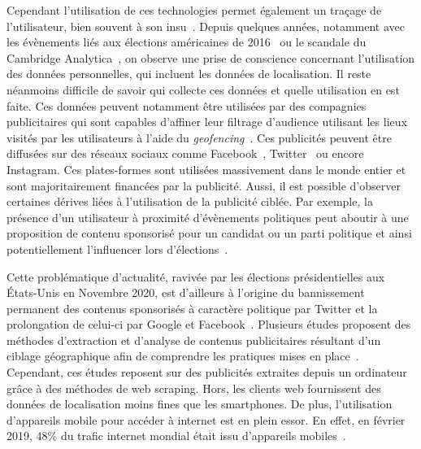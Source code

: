 \documentclass[runningheads]{llncs}
\begin{document}
Cependant l'utilisation de ces technologies permet également un traçage de l'utilisateur, bien souvent à son insu~\cite{almuhimedi_your_2015}. Depuis quelques années, notamment avec les évènements liés aux élections américaines de 2016~\cite{robert_mueller_report_2019} ou le scandale du Cambridge Analytica~\cite{isaak_user_2018}, on observe une prise de conscience concernant l'utilisation des données personnelles, qui incluent les données de localisation. Il reste néanmoins difficile de savoir qui collecte ces données et quelle utilisation en est faite. Ces données peuvent notamment être utilisées par des compagnies publicitaires qui sont capables d'affiner leur filtrage d'audience utilisant les lieux visités par les utilisateurs à l'aide du \textit{geofencing}~\cite{google_geofencing_2020}. Ces publicités peuvent être diffusées sur des réseaux sociaux comme Facebook~\cite{facebook_for_buisness_a_2020}, Twitter~\cite{twitter_geo_2020} ou encore Instagram. Ces plates-formes sont utilisées massivement dans le monde entier et sont majoritairement financées par la publicité. Aussi, il est possible d'observer certaines dérives liées à l'utilisation de la publicité ciblée. Par exemple, la présence d'un utilisateur à proximité d'évènements politiques peut aboutir à une proposition de contenu sponsorisé pour un candidat ou un parti politique et ainsi potentiellement l'influencer lors d'élections~\cite{bradshaw_challenging_nodate}.

Cette problématique d'actualité, ravivée par les élections présidentielles aux États-Unis en Novembre 2020, est d'ailleurs à l'origine du bannissement permanent des contenus sponsorisés à caractère politique par Twitter et la prolongation de celui-ci par Google et Facebook~\cite{facebook_facebook_2020}. Plusieurs études proposent des méthodes d'extraction et d'analyse de contenus publicitaires résultant d'un ciblage géographique afin de comprendre les pratiques mises en place~\cite{}. Cependant, ces études reposent sur des publicités extraites depuis un ordinateur grâce à des méthodes de web scraping. Hors, les clients web fournissent des données de localisation moins fines que les smartphones. De plus, l'utilisation d'appareils mobile pour accéder à internet est en plein essor. En effet, en février 2019, 48\% du trafic internet mondial était issu d'appareils mobiles~\cite{jclement_topic_2019}.
\end{document}
